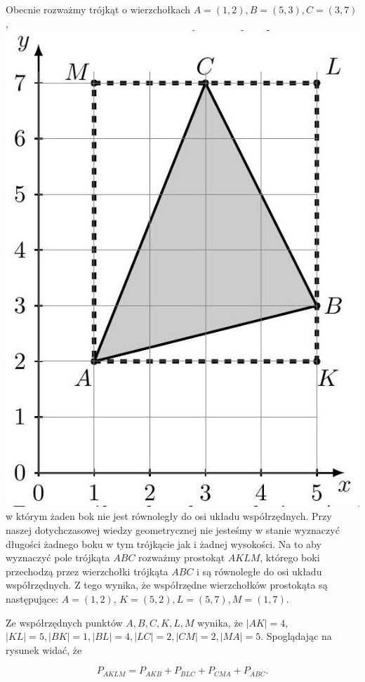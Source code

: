 \documentclass[10pt]{article}
\begin{document}
Obecnie rozważmy trójkąt o wierzchołkach \(A=(1,2), B=(5,3), C=(3,7)\),\\
\includegraphics[max width=\textwidth, center]{2024_11_21_8f01584889ff06348ae7g-204}\\
w którym żaden bok nie jest równoległy do osi układu współrzędnych. Przy naszej dotychczasowej wiedzy geometrycznej nie jesteśmy w stanie wyznaczyć długości żadnego boku w tym trójkącie jak i żadnej wysokości. Na to aby wyznaczyć pole trójkąta \(A B C\) rozważmy prostokąt \(A K L M\), którego boki przechodzą przez wierzchołki trójkąta \(A B C\) i są równoległe do osi układu współrzędnych. Z tego wynika, że współrzędne wierzchołków prostokąta są następujące: \(A=(1,2)\), \(K=(5,2), L=(5,7), M=(1,7)\).

Ze współrzędnych punktów \(A, B, C, K, L, M\) wynika, że \(|A K|=4\), \(|K L|=5,|B K|=1,|B L|=4,|L C|=2,|C M|=2,|M A|=5\). Spoglądając na rysunek widać, że

\[
P_{A K L M}=P_{A K B}+P_{B L C}+P_{C M A}+P_{A B C} .
\]
\end{document}
